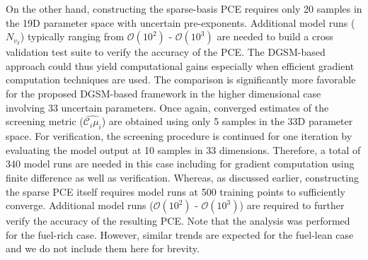 {%
On the other hand, constructing the sparse-basis PCE requires only 20 samples in
the 19D parameter space with uncertain pre-exponents. Additional model runs ($N_{v_2}$)
 typically ranging from
$\mathcal{O}(10^{2})$ - $\mathcal{O}(10^{3})$ are needed to build a cross validation test suite to verify the 
accuracy of the PCE.  
The DGSM-based approach could thus yield computational gains especially when 
efficient gradient computation techniques are used. The comparison is significantly more favorable for the 
proposed DGSM-based framework in the higher dimensional case involving 33 uncertain parameters. 
Once again, converged estimates of the screening metric ($\widehat{\mathcal{C}_i\mu_i}$) are obtained
using only 5 samples in the 33D parameter space. For verification, the screening procedure is
continued for one iteration by evaluating the model output at 10 samples in 33 dimensions. 
Therefore, a total of 340 model runs are needed in this case
including for gradient computation using finite difference as well as verification. Whereas, as discussed earlier,
constructing the sparse PCE itself requires model runs at 500 training points to sufficiently converge. Additional
model runs ($\mathcal{O}(10^{2})$ - $\mathcal{O}(10^{3})$) are required to further verify the accuracy of the 
resulting PCE. Note that the analysis was performed
for the fuel-rich case. However, similar trends are expected for the fuel-lean case and we do not include them here
for brevity. 

}
